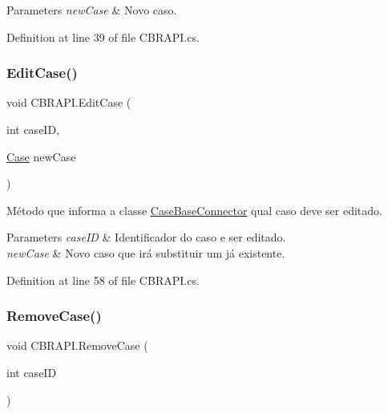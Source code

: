 \begin{DoxyParams}{Parameters}
{\em new\+Case} & Novo caso.\\
\hline
\end{DoxyParams}


Definition at line 39 of file C\+B\+R\+A\+P\+I.\+cs.

\hypertarget{class_c_b_r_a_p_i_a80d48f14d29ee6c2ac4bacff19ea9c0c}{}\label{class_c_b_r_a_p_i_a80d48f14d29ee6c2ac4bacff19ea9c0c} 
\subsubsection{\texorpdfstring{Edit\+Case()}{EditCase()}}
{\footnotesize\ttfamily void C\+B\+R\+A\+P\+I.\+Edit\+Case (\begin{DoxyParamCaption}\item[{int}]{case\+ID,  }\item[{\hyperlink{class_case}{Case}}]{new\+Case }\end{DoxyParamCaption})}



Método que informa a classe \hyperlink{class_case_base_connector}{Case\+Base\+Connector} qual caso deve ser editado. 


\begin{DoxyParams}{Parameters}
{\em case\+ID} & Identificador do caso e ser editado.\\
\hline
{\em new\+Case} & Novo caso que irá substituir um já existente.\\
\hline
\end{DoxyParams}


Definition at line 58 of file C\+B\+R\+A\+P\+I.\+cs.

\hypertarget{class_c_b_r_a_p_i_a592d54dfb86d74154ed0e74dc3aa6f73}{}\label{class_c_b_r_a_p_i_a592d54dfb86d74154ed0e74dc3aa6f73} 
\subsubsection{\texorpdfstring{Remove\+Case()}{RemoveCase()}}
{\footnotesize\ttfamily void C\+B\+R\+A\+P\+I.\+Remove\+Case (\begin{DoxyParamCaption}\item[{int}]{case\+ID }\end{DoxyParamCaption})}



